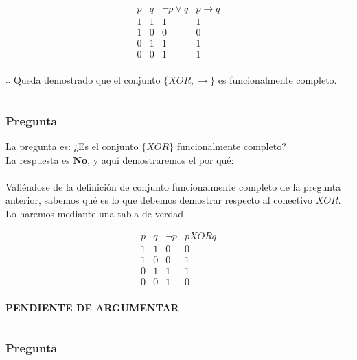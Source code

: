 \documentclass[12pt]{article}
\begin{document}
\[
\begin{array}{c|c|c|c} 
p & q & \neg p \lor q & p \rightarrow q \\ \hline
1 & 1 & 1 & 1 \\
1 & 0 & 0 & 0 \\
0 & 1 & 1 & 1 \\
0 & 0 & 1 & 1 \\
\end{array}
\]

$\therefore$ Queda demostrado que el conjunto $\{XOR, \rightarrow \}$ es funcionalmente completo.

\rule{\linewidth}{0.4pt}



\subsubsection*{Pregunta }

La pregunta es: ¿Es el conjunto $\{XOR\}$ funcionalmente completo?
\\La respuesta es \textbf{No}, y aquí demostraremos el por qué:
\\ \\ Valiéndose de la definición de conjunto funcionalmente completo de la pregunta anterior, sabemos qué es lo que debemos demostrar
respecto al conectivo $XOR$. Lo haremos mediante una tabla de verdad

\[
\begin{array}{c|c|c|c}
p & q & \neg p & p XOR q \\ \hline
1 & 1 & 0 & 0 \\
1 & 0 & 0 & 1 \\
0 & 1 & 1 & 1 \\
0 & 0 & 1 & 0 \\
\end{array}
\]

\textbf{PENDIENTE DE ARGUMENTAR}

\rule{\linewidth}{0.4pt}



\newpage
\subsubsection*{Pregunta }
\end{document}
